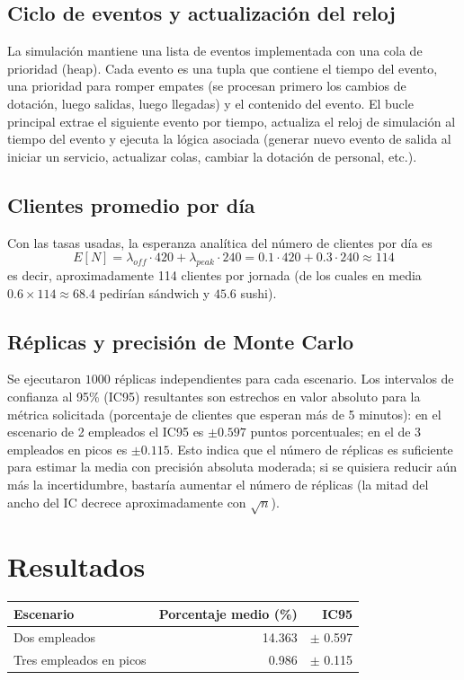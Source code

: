 \documentclass[11pt]{article}
\begin{document}
\subsection*{Ciclo de eventos y actualización del reloj}
La simulación mantiene una lista de eventos implementada con una cola de prioridad (heap). Cada evento es una tupla que contiene el tiempo del evento, una prioridad para romper empates (se procesan primero los cambios de dotación, luego salidas, luego llegadas) y el contenido del evento. El bucle principal extrae el siguiente evento por tiempo, actualiza el reloj de simulación al tiempo del evento y ejecuta la lógica asociada (generar nuevo evento de salida al iniciar un servicio, actualizar colas, cambiar la dotación de personal, etc.).

\subsection*{Clientes promedio por día}
Con las tasas usadas, la esperanza analítica del número de clientes por día es
$$E[N]=\lambda_{off}\cdot 420 + \lambda_{peak}\cdot 240 = 0.1\cdot420 + 0.3\cdot240 \approx 114$$
es decir, aproximadamente 114 clientes por jornada (de los cuales en media $0.6\times114\approx68.4$ pedirían sándwich y $45.6$ sushi).

\subsection*{Réplicas y precisión de Monte Carlo}
Se ejecutaron $1000$ réplicas independientes para cada escenario. Los intervalos de confianza al 95\% (IC95) resultantes son estrechos en valor absoluto para la métrica solicitada (porcentaje de clientes que esperan más de 5 minutos): en el escenario de 2 empleados el IC95 es $\pm0.597$ puntos porcentuales; en el de 3 empleados en picos es $\pm0.115$. Esto indica que el número de réplicas es suficiente para estimar la media con precisión absoluta moderada; si se quisiera reducir aún más la incertidumbre, bastaría aumentar el número de réplicas (la mitad del ancho del IC decrece aproximadamente con $\sqrt{n}$).

\section*{Resultados}
\begin{tabular}{lrr}
\toprule
Escenario & Porcentaje medio (\%) & IC95 \\ 
\midrule
Dos empleados & 14.363 & $\pm$ 0.597 \\ 
Tres empleados en picos & 0.986 & $\pm$ 0.115 \\ 
\bottomrule
\end{tabular}
\end{document}
